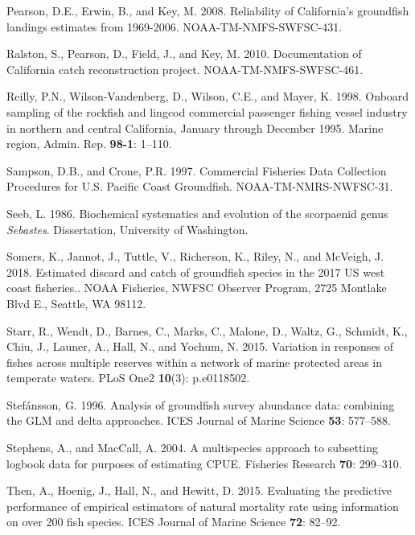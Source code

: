 \documentclass[12pt,]{article}
\begin{document}
\hypertarget{ref-Pearson2008}{}
Pearson, D.E., Erwin, B., and Key, M. 2008. Reliability of California's
groundfish landings estimates from 1969-2006. NOAA-TM-NMFS-SWFSC-431.

\hypertarget{ref-Ralston2010}{}
Ralston, S., Pearson, D., Field, J., and Key, M. 2010. Documentation of
California catch reconstruction project. NOAA-TM-NMFS-SWFSC-461.

\hypertarget{ref-Reilly1998}{}
Reilly, P.N., Wilson-Vandenberg, D., Wilson, C.E., and Mayer, K. 1998.
Onboard sampling of the rockfish and lingcod commercial passenger
fishing vessel industry in northern and central California, January
through December 1995. Marine region, Admin. Rep. \textbf{98-1}: 1--110.

\hypertarget{ref-Sampson1997}{}
Sampson, D.B., and Crone, P.R. 1997. Commercial Fisheries Data
Collection Procedures for U.S. Pacific Coast Groundfish.
NOAA-TM-NMRS-NWFSC-31.

\hypertarget{ref-Seeb1986}{}
Seeb, L. 1986. Biochemical systematics and evolution of the scorpaenid
genus \emph{Sebastes}. Dissertation, University of Washington.

\hypertarget{ref-Somers2018}{}
Somers, K., Jannot, J., Tuttle, V., Richerson, K., Riley, N., and
McVeigh, J. 2018. Estimated discard and catch of groundfish species in
the 2017 US west coast fisheries.. NOAA Fisheries, NWFSC Observer
Program, 2725 Montlake Blvd E., Seattle, WA 98112.

\hypertarget{ref-Starr2015}{}
Starr, R., Wendt, D., Barnes, C., Marks, C., Malone, D., Waltz, G.,
Schmidt, K., Chiu, J., Launer, A., Hall, N., and Yochum, N. 2015.
Variation in responses of fishes across multiple reserves within a
network of marine protected areas in temperate waters. PLoS One2
\textbf{10}(3): p.e0118502.

\hypertarget{ref-Stefansson1996}{}
Stefánsson, G. 1996. Analysis of groundfish survey abundance data:
combining the GLM and delta approaches. ICES Journal of Marine Science
\textbf{53}: 577--588.

\hypertarget{ref-Stephens2004}{}
Stephens, A., and MacCall, A. 2004. A multispecies approach to
subsetting logbook data for purposes of estimating CPUE. Fisheries
Research \textbf{70}: 299--310.

\hypertarget{ref-Then2015}{}
Then, A., Hoenig, J., Hall, N., and Hewitt, D. 2015. Evaluating the
predictive performance of empirical estimators of natural mortality rate
using information on over 200 fish species. ICES Journal of Marine
Science \textbf{72}: 82--92.
\end{document}
